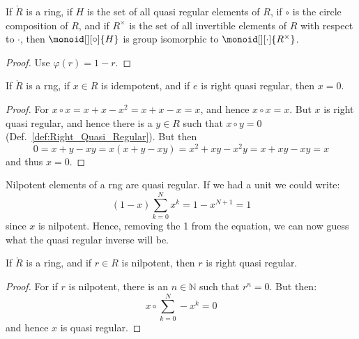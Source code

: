 \documentclass{article}                                                        %
\begin{document}
                \begin{theorem}
                    If $\ring{R}$ is a ring, if $H$ is the set of all quasi
                    regular elements of $R$, if $\circ$ is the circle
                    composition of $R$, and if $R^{\times}$ is the set of all
                    invertible elements of $R$ with respect to $\cdot$, then
                    $\monoid[][\circ]{H}$ is group isomorphic to
                    $\monoid[][\cdot]{R^{\times}}$.
                \end{theorem}
                \begin{proof}
                    Use $\varphi(r)=1-r$.
                \end{proof}
                \begin{theorem}
                    If $\ring{R}$ is a rng, if $x\in{R}$ is idempotent, and if
                    $e$ is right quasi regular, then $x=0$.
                \end{theorem}
                \begin{proof}
                    For $x\circ{x}=x+x-x^{2}=x+x-x=x$, and hence
                    $x\circ{x}=x$. But $x$ is right quasi regular, and hence
                    there is a $y\in{R}$ such that $x\circ{y}=0$
                    (Def.~\ref{def:Right_Quasi_Regular}). But then
                    \begin{equation}
                        0=x+y-xy=x(x+y-xy)=x^{2}+xy-x^{2}y=x+xy-xy=x
                    \end{equation}
                    and thus $x=0$.
                \end{proof}
                Nilpotent elements of a rng are quasi regular. If we had a unit
                we could write:
                \begin{equation}
                    (1-x)\sum_{k=0}^{N}x^{k}=1-x^{N+1}=1
                \end{equation}
                since $x$ is nilpotent. Hence, removing the 1 from the equation,
                we can now guess what the quasi regular inverse will be.
                \begin{theorem}
                    If $\ring{R}$ is a ring, and if $r\in{R}$ is nilpotent, then
                    $r$ is right quasi regular.
                \end{theorem}
                \begin{proof}
                    For if $r$ is nilpotent, there is an $n\in\mathbb{N}$ such
                    that $r^{n}=0$. But then:
                    \begin{equation}
                        x\circ\sum_{k=0}^{N}\minus{x}^{k}=0
                    \end{equation}
                    and hence $x$ is quasi regular.
                \end{proof}
\end{document}

